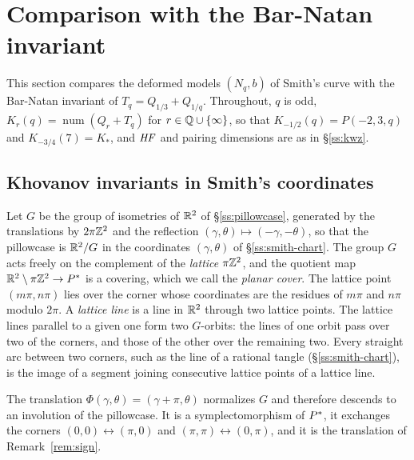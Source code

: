 \section{Comparison with the Bar-Natan invariant}\label{sec:khovanov}

This section compares the deformed models $(N_q,b)$ of Smith's curve with the Bar-Natan invariant of
$T_q=Q_{1/3}+Q_{1/q}$.  Throughout, $q$ is odd, $K_r(q)=\operatorname{num}(Q_r+T_q)$ for
$r\in\mathbb{Q}\cup\{\infty\}$, so that $K_{-1/2}(q)=P(-2,3,q)$ and $K_{-3/4}(7)=K_*$, and $\mathit{HF}$ and pairing
dimensions are as in \S\ref{ss:kwz}.

\subsection{Khovanov invariants in Smith's coordinates}\label{ss:kh-smith}
Let $G$ be the group of isometries of $\mathbb{R}^2$ of \S\ref{ss:pillowcase}, generated by the translations by
$2\pi\mathbb{Z}^2$ and the reflection $(\gamma,\theta)\mapsto(-\gamma,-\theta)$, so that the pillowcase is $\mathbb{R}^2/G$ in the coordinates
$(\gamma,\theta)$ of \S\ref{ss:smith-chart}.  The group $G$ acts freely on the complement of the \emph{lattice} $\pi\mathbb{Z}^2$, and
the quotient map $\mathbb{R}^2\setminus\pi\mathbb{Z}^2\to P^{*}$ is a covering, which we call the \emph{planar cover}.
The lattice point $(m\pi,n\pi)$ lies over the corner whose coordinates are the residues of $m\pi$
and $n\pi$ modulo $2\pi$.  A \emph{lattice line} is a line in $\mathbb{R}^2$ through two lattice points.  The
lattice lines parallel to a given one form two $G$-orbits: the lines of one orbit pass over two of
the corners, and those of the other over the remaining two.  Every straight arc between two corners,
such as the line of a rational tangle (\S\ref{ss:smith-chart}), is the image of a segment joining
consecutive lattice points of a lattice line.

The translation $\Phi(\gamma,\theta)=(\gamma+\pi,\theta)$ normalizes $G$ and therefore descends to an
involution of the pillowcase.  It is a symplectomorphism of $P^{*}$, it exchanges the corners
$(0,0)\leftrightarrow(\pi,0)$ and $(\pi,\pi)\leftrightarrow(0,\pi)$, and it is the translation of
Remark~\ref{rem:sign}.

